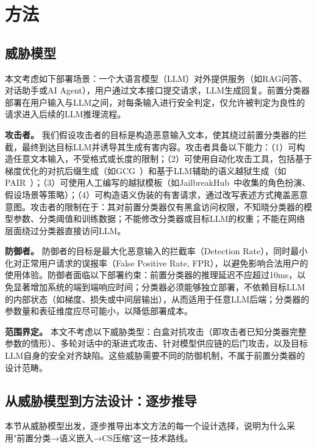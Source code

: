 \section{方法}

\subsection{威胁模型}

本文考虑如下部署场景：一个大语言模型（LLM）对外提供服务（如RAG问答、对话助手或AI Agent），用户通过文本接口提交请求，LLM生成回复。前置分类器部署在用户输入与LLM之间，对每条输入进行安全判定，仅允许被判定为良性的请求进入后续的LLM推理流程。

\textbf{攻击者。} 我们假设攻击者的目标是构造恶意输入文本，使其绕过前置分类器的拦截，最终到达目标LLM并诱导其生成有害内容。攻击者具备以下能力：（1）可构造任意文本输入，不受格式或长度的限制；（2）可使用自动化攻击工具，包括基于梯度优化的对抗后缀生成（如GCG~\cite{zou2023universal}）和基于LLM辅助的语义越狱生成（如PAIR~\cite{chao2023jailbreaking}）；（3）可使用人工编写的越狱模板（如JailbreakHub~\cite{shen2024anything}中收集的角色扮演、假设场景等策略）；（4）可构造语义伪装的有害请求，通过改写表述方式掩盖恶意意图。攻击者的限制在于：其对前置分类器仅有黑盒访问权限，不知晓分类器的模型参数、分类阈值和训练数据；不能修改分类器或目标LLM的权重；不能在网络层面绕过分类器直接访问LLM。

\textbf{防御者。} 防御者的目标是最大化恶意输入的拦截率（Detection Rate），同时最小化对正常用户请求的误报率（False Positive Rate, FPR），以避免影响合法用户的使用体验。防御者面临以下部署约束：前置分类器的推理延迟不应超过10ms，以免显著增加系统的端到端响应时间；分类器必须能够独立部署，不依赖目标LLM的内部状态（如梯度、损失或中间层输出），从而适用于任意LLM后端；分类器的参数量和表征维度应尽可能小，以降低部署成本。

\textbf{范围界定。} 本文不考虑以下威胁类型：白盒对抗攻击（即攻击者已知分类器完整参数的情形）、多轮对话中的渐进式攻击、针对模型供应链的后门攻击，以及目标LLM自身的安全对齐缺陷。这些威胁需要不同的防御机制，不属于前置分类器的设计范畴。


\subsection{从威胁模型到方法设计：逐步推导}

本节从威胁模型出发，逐步推导出本文方法的每一个设计选择，说明为什么采用"前置分类→语义嵌入→CS压缩"这一技术路线。

